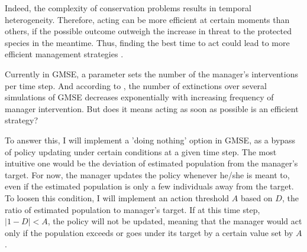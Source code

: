 \documentclass[12pt,a4paper]{article}
\begin{document}
Indeed, the complexity of conservation problems results in temporal heterogeneity.
Therefore, acting can be more efficient at certain moments than others, if the possible outcome outweigh the increase in threat to the protected species in the meantime.
Thus, finding the best time to act could lead to more efficient management strategies \citep{Iacona2017waiting}.
%

Currently in GMSE, a parameter sets the number of the manager's interventions per time step.
And according to \cite{duthie2018}, the number of extinctions over several simulations of GMSE decreases exponentially with increasing frequency of manager intervention.
But does it means acting as soon as possible is an efficient strategy?

To answer this, I will implement a 'doing nothing' option in GMSE, as a bypass of policy updating under certain conditions at a given time step.
The most intuitive one would be the deviation of estimated population from the manager's target.
For now, the manager updates the policy whenever he/she is meant to, even if the estimated population is only a few individuals away from the target.
To loosen this condition, I will implement an action threshold $A$ based on $D$, the ratio of estimated population to manager's target.
If at this time step, $|1 - D| < A$, the policy will not be updated, meaning that the manager would act only if the population exceeds or goes under its target by a certain value set by $A$.
\end{document}

